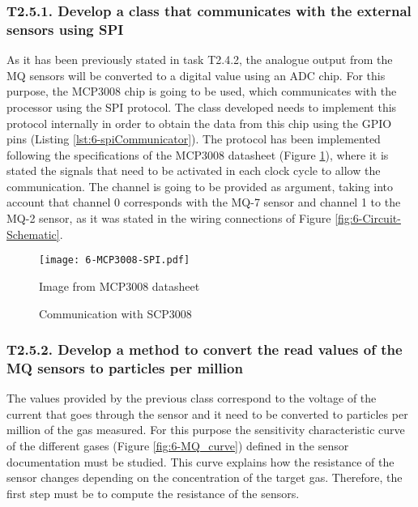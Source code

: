 \subsubsection{T2.5.1. Develop a class that communicates with the external sensors using \ac{SPI}}
As it has been previously stated in task T2.4.2, the analogue output from the MQ sensors will be converted to a digital value using an \ac{ADC} chip. For this purpose, the MCP3008 chip \cite{ADC} is going to be used, which communicates with the processor using the \ac{SPI} protocol. The class developed needs to implement this protocol internally in order to obtain the data from this chip using the GPIO pins (Listing \ref{lst:6-spiCommunicator}). The protocol has been implemented following the specifications of the MCP3008 datasheet (Figure \ref{fig:6-MCP3008-SPI}), where it is stated the signals that need to be activated in each clock cycle to allow the communication. The channel is going to be provided as argument, taking into account that channel 0 corresponds with the MQ-7 sensor and channel 1 to the MQ-2 sensor, as it was stated in the wiring connections of Figure \ref{fig:6-Circuit-Schematic}.

\begin{figure}[!h]
	\begin{center}
		\texttt{[image: 6-MCP3008-SPI.pdf]}
		\caption{Communication with SCP3008}{Image from MCP3008 datasheet \cite{ADC}}
		\label{fig:6-MCP3008-SPI}
	\end{center}
\end{figure}




\subsubsection{T2.5.2. Develop a method to convert the read values of the MQ sensors to particles per million}
The values provided by the previous class correspond to the voltage of the current that goes through the sensor and it need to be converted to particles per million of the gas measured. For this purpose the sensitivity characteristic curve of the different gases (Figure \ref{fig:6-MQ_curve}) defined in the sensor documentation must be studied. This curve explains how the resistance of the sensor changes depending on the concentration of the target gas. Therefore, the first step must be to compute the resistance of the sensors. 

